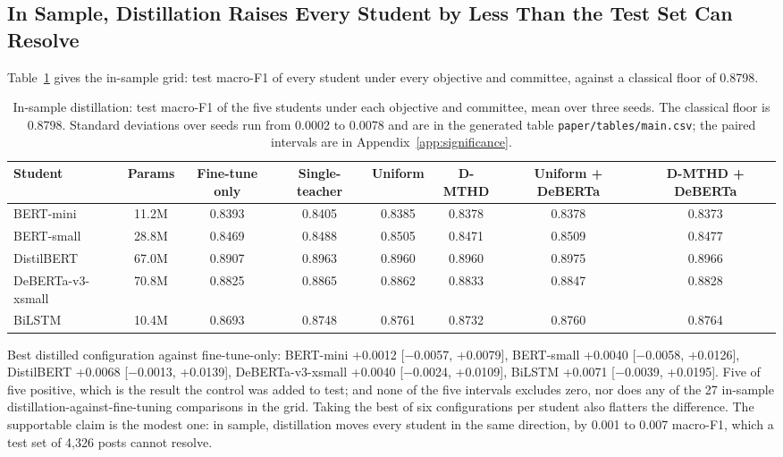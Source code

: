 \subsection{In Sample, Distillation Raises Every Student by Less Than the Test Set Can Resolve}
\label{sec:5.2}
Table~\ref{tab:main} gives the in-sample grid: test macro-F1 of every student under every objective
and committee, against a classical floor of 0.8798.

\begin{table}[htbp]
\centering
\small
\caption[In-sample distillation on the five students]{In-sample distillation: test macro-F1 of the five students under each objective and committee, mean over three seeds. The classical floor is 0.8798. Standard deviations over seeds run from 0.0002 to 0.0078 and are in the generated table \texttt{paper/tables/main.csv}; the paired intervals are in Appendix~\ref{app:significance}.}
\label{tab:main}
\begin{adjustbox}{max width=\textwidth}
\begin{tabular}{lccccccc}
\toprule
Student & Params & Fine-tune only & Single-teacher & Uniform & D-MTHD & Uniform + DeBERTa & D-MTHD + DeBERTa \\
\midrule
BERT-mini & 11.2M & 0.8393 & 0.8405 & 0.8385 & 0.8378 & 0.8378 & 0.8373 \\
BERT-small & 28.8M & 0.8469 & 0.8488 & 0.8505 & 0.8471 & 0.8509 & 0.8477 \\
DistilBERT & 67.0M & 0.8907 & 0.8963 & 0.8960 & 0.8960 & 0.8975 & 0.8966 \\
DeBERTa-v3-xsmall & 70.8M & 0.8825 & 0.8865 & 0.8862 & 0.8833 & 0.8847 & 0.8828 \\
BiLSTM & 10.4M & 0.8693 & 0.8748 & 0.8761 & 0.8732 & 0.8760 & 0.8764 \\
\bottomrule
\end{tabular}
\end{adjustbox}
\end{table}

Best distilled configuration against fine-tune-only: BERT-mini +0.0012 [$-$0.0057, +0.0079],
BERT-small +0.0040 [$-$0.0058, +0.0126], DistilBERT +0.0068 [$-$0.0013, +0.0139], DeBERTa-v3-xsmall
+0.0040 [$-$0.0024, +0.0109], BiLSTM +0.0071 [$-$0.0039, +0.0195]. Five of five positive, which is
the result the control was added to test; and none of the five intervals excludes zero, nor does any
of the 27 in-sample distillation-against-fine-tuning comparisons in the grid. Taking the best of six
configurations per student also flatters the difference. The supportable claim is the modest one: in
sample, distillation moves every student in the same direction, by 0.001 to 0.007 macro-F1, which a
test set of 4,326 posts cannot resolve.

